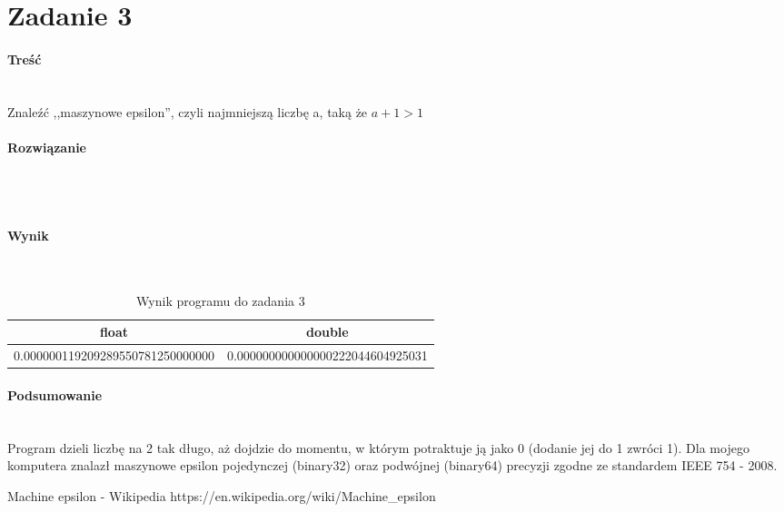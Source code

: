 \section*{Zadanie 3} \label{sec:Zadanie3}

\paragraph{Treść} ~\\
Znaleźć ,,maszynowe epsilon'', czyli najmniejszą liczbę a, taką że $ a + 1 > 1 $ \\

\paragraph{Rozwiązanie} ~\\
 ~\\

\paragraph{Wynik} ~\\
\begin{table}[h]
  \centering
  \begin{tabular}{c|c}
    float & double \\
    \hline 0.000000119209289550781250000000 & 0.000000000000000222044604925031 \\
  \end{tabular}
  \caption{Wynik programu do zadania 3}
  \label{tab:WynikProgramuDoZadania3}
\end{table}

\paragraph{Podsumowanie} ~\\
Program dzieli liczbę na 2 tak długo, aż dojdzie do momentu, w którym potraktuje ją jako 0 (dodanie jej do 1 zwróci 1).
Dla mojego komputera znalazł maszynowe epsilon pojedynczej (binary32) oraz podwójnej (binary64) precyzji zgodne ze standardem IEEE 754 - 2008\nocite{WikiMachineEpsilon}.

\begin{thebibliography}{9}
   Machine epsilon - Wikipedia https://en.wikipedia.org/wiki/Machine\_epsilon
\end{thebibliography}
